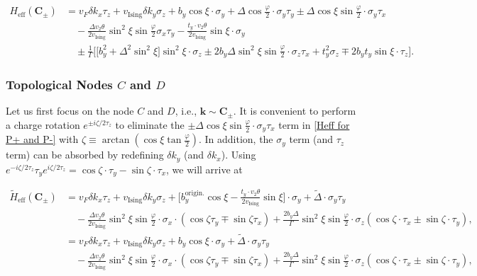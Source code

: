 \begin{subappendices}
\begin{align}
					H_{\text{eff}}(\bm{C}_\pm)&=v_F\delta k_x \tau_z+v_{\text{Ising}}\delta k_y \sigma_z+b_y\cos\xi\cdot\sigma_y+\Delta\cos\frac{\varphi}{2}\cdot\sigma_y\tau_y\pm\Delta\cos\xi\sin\frac{\varphi}{2}\cdot\sigma_y\tau_x\nonumber\\
					&\quad-\frac{\Delta v_2\theta}{2v_{\text{Ising}}}\sin^2\xi\sin\frac{\varphi}{2}\sigma_x\tau_y-\frac{t_y\cdot v_2\theta}{2v_{\text{Ising}}}\sin\xi\cdot\sigma_y\nonumber\\
					&\quad\pm\frac{1}{\Gamma}\Big[\big[b_y^2+\Delta^2\sin^2\xi\big]\sin^2\xi\cdot\sigma_z\pm2b_y\Delta\sin^2\xi\sin\frac{\varphi}{2}\cdot\sigma_z\tau_x+t_y^2\sigma_z\mp 2b_y t_y \sin\xi\cdot\tau_z\Big]\label{Heff for P+ and P-}.
				\end{align}
			
		\subsubsection{Topological Nodes $C$ and $D$}
			Let us first focus on the node $C$ and $D$, i.e., $\bm{k}\sim\bm{C}_\pm$. It is convenient to perform a charge rotation $e^{\pm i\zeta/2\tau_z}$ to eliminate the $\pm\Delta\cos\xi\sin\frac{\varphi}{2}\cdot\sigma_y\tau_x$ term in \eqref{Heff for P+ and P-} with $\zeta\equiv\arctan(\cos\xi\tan\frac{\varphi}{2})$. In addition, the $\sigma_y$ term (and $\tau_z$ term) can be absorbed by redefining $\delta k_y$ (and $\delta k_x$). Using $e^{-i\zeta/2\tau_z}\tau_y e^{i\zeta/2\tau_z}=\cos\zeta\cdot\tau_y-\sin\zeta\cdot\tau_x$, we will arrive at
			
				\begin{align}
					\widetilde{H}_{\text{eff}}(\bm{C}_\pm)&=v_F\delta k_x \tau_z+v_{\text{Ising}}\delta k_y \sigma_z+\Big[b_y^{\text{origin.}}\cos\xi-\frac{t_y\cdot v_2\theta}{2v_{\text{Ising}}}\sin\xi\Big]\cdot\sigma_y+\tilde\Delta\cdot\sigma_y\tau_y\nonumber\\
					&\quad-\frac{\Delta v_2\theta}{2v_{\text{Ising}}}\sin^2\xi\sin\frac{\varphi}{2}\cdot\sigma_x\cdot(\cos\zeta\tau_y\mp\sin\zeta\tau_x)+\frac{2b_y\Delta}{\Gamma}\sin^2\xi\sin\frac{\varphi}{2}\cdot\sigma_z(\cos\zeta\cdot\tau_x\pm \sin\zeta\cdot\tau_y),\nonumber\\
					&=v_F\delta k_x \tau_z+v_{\text{Ising}}\delta k_y \sigma_z+b_y\cos\xi\cdot\sigma_y+\widetilde\Delta\cdot\sigma_y\tau_y\nonumber\\
					&\quad-\frac{\Delta v_2\theta}{2v_{\text{Ising}}}\sin^2\xi\sin\frac{\varphi}{2}\cdot\sigma_x\cdot(\cos\zeta\tau_y\mp\sin\zeta\tau_x)+\frac{2b_y\Delta}{\Gamma}\sin^2\xi\sin\frac{\varphi}{2}\cdot\sigma_z(\cos\zeta\cdot\tau_x\pm \sin\zeta\cdot\tau_y)\label{Heff_tilde for P+ and P-},
				\end{align}
			

\end{subappendices}
